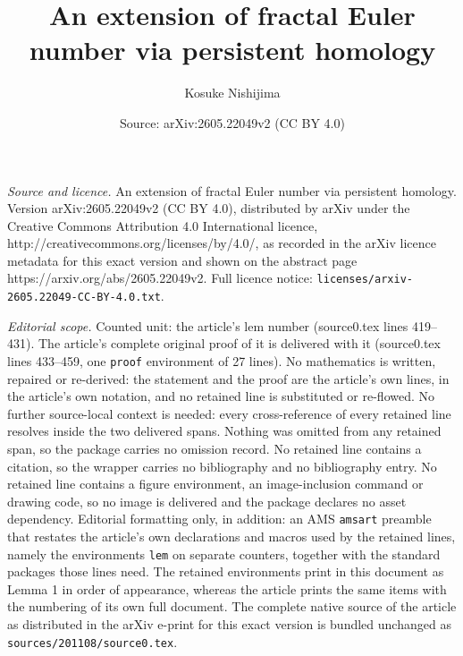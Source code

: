 \documentclass[10pt,a4paper]{amsart}
\title{An extension of fractal Euler number via persistent homology}
\author{Kosuke Nishijima}
\date{Source: arXiv:2605.22049v2 (CC BY 4.0)}
\begin{document}
\maketitle

\noindent\emph{Source and licence.} An extension of fractal Euler number via persistent homology. Version arXiv:2605.22049v2 (CC BY 4.0), distributed by arXiv under the Creative Commons Attribution 4.0 International licence, http://creativecommons.org/licenses/by/4.0/, as recorded in the arXiv licence metadata for this exact version and shown on the abstract page https://arxiv.org/abs/2605.22049v2. Full licence notice: \texttt{licenses/arxiv-2605.22049-CC-BY-4.0.txt}.\par\smallskip

\noindent\textit{Editorial scope.} Counted unit: the article's lem number (source0.tex lines 419--431). The article's complete original proof of it is delivered with it (source0.tex lines 433--459, one \texttt{proof} environment of 27 lines). No mathematics is written, repaired or re-derived: the statement and the proof are the article's own lines, in the article's own notation, and no retained line is substituted or re-flowed.  No further source-local context is needed: every cross-reference of every retained line resolves inside the two delivered spans.  Nothing was omitted from any retained span, so the package carries no omission record.  No retained line contains a citation, so the wrapper carries no bibliography and no bibliography entry.  No retained line contains a figure environment, an image-inclusion command or drawing code, so no image is delivered and the package declares no asset dependency.  Editorial formatting only, in addition: an AMS \texttt{amsart} preamble that restates the article's own declarations and macros used by the retained lines, namely the environments \texttt{lem} on separate counters, together with the standard packages those lines need.  The retained environments print in this document as Lemma 1 in order of appearance, whereas the article prints the same items with the numbering of its own full document.  The complete native source of the article as distributed in the arXiv e-print for this exact version is bundled unchanged as \texttt{sources/201108/source0.tex}.
\end{document}
